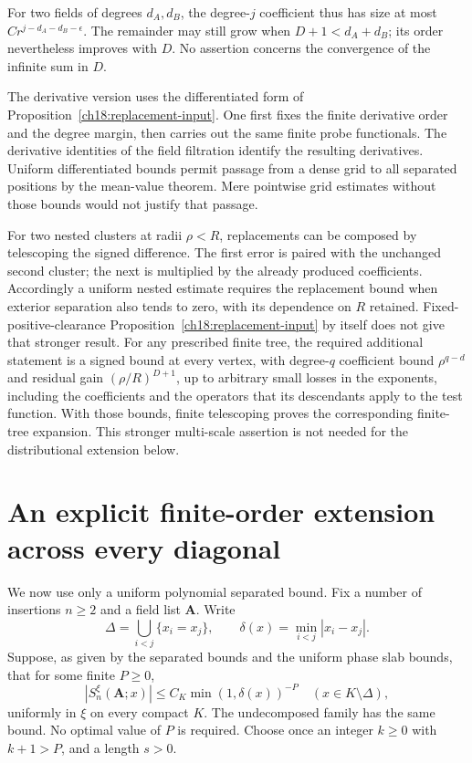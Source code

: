 For two fields of degrees $d_A,d_B$, the degree-$j$ coefficient thus
has size at most $C r^{j-d_A-d_B-\epsilon}$. The remainder may still
grow when $D+1<d_A+d_B$; its order nevertheless improves with $D$.
No assertion concerns the convergence of the infinite sum in $D$.

The derivative version uses the differentiated form of Proposition~\ref{ch18:replacement-input}. One first fixes the finite derivative order and the degree
margin, then carries out the same finite probe functionals. The derivative
identities of the field filtration identify the resulting derivatives.
Uniform differentiated bounds permit passage from a dense grid to all
separated positions by the mean-value theorem. Mere pointwise grid
estimates without those bounds would not justify that passage.

For two nested clusters at radii $\rho<R$, replacements can be composed
by telescoping the signed difference. The first error is paired with
the unchanged second cluster; the next is multiplied by the already
produced coefficients. Accordingly a uniform nested estimate requires
the replacement bound when exterior separation also tends to zero,
with its dependence on $R$ retained. Fixed-positive-clearance
Proposition~\ref{ch18:replacement-input} by itself does not give that
stronger result. For any prescribed finite tree, the required additional
statement is a signed bound at every vertex, with degree-$q$ coefficient
bound $\rho^{q-d}$ and residual gain $(\rho/R)^{D+1}$, up to arbitrary
small losses in the exponents, including the coefficients and the operators that its descendants apply to the test function. With those bounds, finite telescoping proves the
corresponding finite-tree expansion. This stronger multi-scale assertion
is not needed for the distributional extension below.

\section{An explicit finite-order extension across every diagonal}
\label{ch18:extension}

We now use only a uniform polynomial separated bound. Fix a number of insertions
$n\ge2$ and a field list $\boldsymbol A$. Write
\[
 \Delta=\bigcup_{i<j}\{x_i=x_j\},\qquad
 \delta(x)=\min_{i<j}|x_i-x_j|.
\]
Suppose, as given by the separated bounds and the uniform phase slab
bounds, that for some finite $P\ge0$,
\begin{equation}
 |S_n^\xi(\boldsymbol A;x)|\le C_K\min(1,\delta(x))^{-P}
 \quad(x\in K\setminus\Delta),
 \label{ch18:polynomial}
\end{equation}
uniformly in $\xi$ on every compact $K$. The undecomposed family has the same
bound. No optimal value of $P$ is required. Choose once an integer
$k\ge0$ with $k+1>P$, and a length $s>0$.

